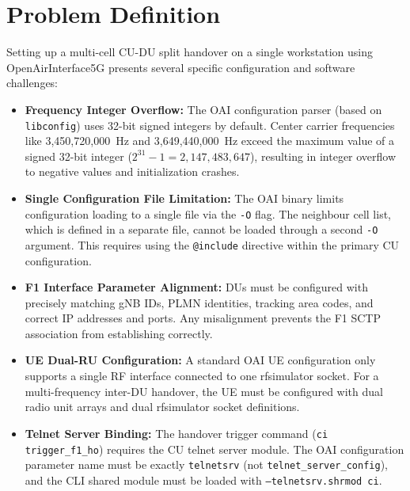 \section{Problem Definition}
\justify
Setting up a multi-cell CU-DU split handover on a single workstation using OpenAirInterface5G presents several specific configuration and software challenges:
\begin{itemize}[leftmargin=*]
    \item \textbf{Frequency Integer Overflow:} The OAI configuration parser (based on \texttt{libconfig}) uses 32-bit signed integers by default. Center carrier frequencies like 3,450,720,000~Hz and 3,649,440,000~Hz exceed the maximum value of a signed 32-bit integer ($2^{31}-1 = 2,147,483,647$), resulting in integer overflow to negative values and initialization crashes.
    
    \item \textbf{Single Configuration File Limitation:} The OAI binary limits configuration loading to a single file via the \texttt{-O} flag. The neighbour cell list, which is defined in a separate file, cannot be loaded through a second \texttt{-O} argument. This requires using the \texttt{@include} directive within the primary CU configuration.
    
    \item \textbf{F1 Interface Parameter Alignment:} DUs must be configured with precisely matching gNB IDs, PLMN identities, tracking area codes, and correct IP addresses and ports. Any misalignment prevents the F1 SCTP association from establishing correctly.
    
    \item \textbf{UE Dual-RU Configuration:} A standard OAI UE configuration only supports a single RF interface connected to one rfsimulator socket. For a multi-frequency inter-DU handover, the UE must be configured with dual radio unit arrays and dual rfsimulator socket definitions.
    
    \item \textbf{Telnet Server Binding:} The handover trigger command (\texttt{ci trigger\_f1\_ho}) requires the CU telnet server module. The OAI configuration parameter name must be exactly \texttt{telnetsrv} (not \texttt{telnet\_server\_config}), and the CLI shared module must be loaded with \texttt{--telnetsrv.shrmod ci}.
\end{itemize}


